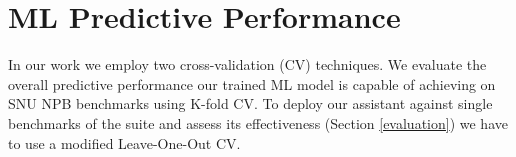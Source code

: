 



\section{ML Predictive Performance}
\label{ml_predictive_performance}

In our work we employ two cross-validation (CV) techniques. We evaluate the overall predictive performance our trained ML model is capable of achieving on SNU NPB benchmarks using K-fold CV. To deploy our assistant against single benchmarks of the suite and assess its effectiveness (Section \ref{evaluation}) we have to use a modified Leave-One-Out CV.

